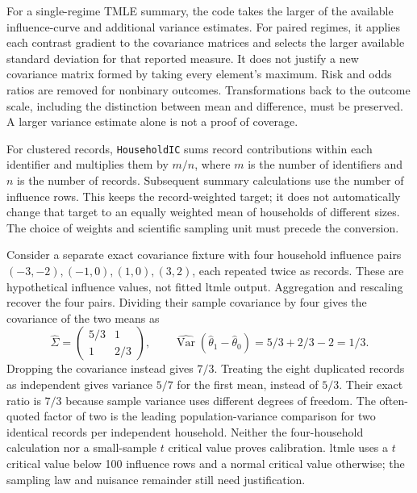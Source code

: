 For a single-regime TMLE summary, the code takes the larger of the available
influence-curve and additional variance estimates. For paired regimes, it
applies each contrast gradient to the covariance matrices and selects the
larger available standard deviation for that reported measure. It does not
justify a new covariance matrix formed by taking every element's maximum.
Risk and odds ratios are removed for nonbinary outcomes. Transformations back
to the outcome scale, including the distinction between mean and difference,
must be preserved. A larger variance estimate alone is not a proof of
coverage.~\citep{exec23_ltmle_source}

For clustered records, \texttt{HouseholdIC} sums record contributions within
each identifier and multiplies them by $m/n$, where $m$ is the number of
identifiers and $n$ is the number of records. Subsequent summary calculations
use the number of influence rows. This keeps the record-weighted target;
it does not automatically change that target to an equally weighted mean
of households of different sizes. The choice of weights and scientific
sampling unit must precede the conversion.

Consider a separate exact covariance fixture with four household influence
pairs $(-3,-2),(-1,0),(1,0),(3,2)$, each repeated twice as records. These are
hypothetical influence values, not fitted ltmle output. Aggregation and
rescaling recover the four pairs. Dividing their sample covariance by four
gives the covariance of the two means as
\begin{equation}
 \widehat\Sigma=\begin{pmatrix}5/3&1\\1&2/3\end{pmatrix},\qquad
 \widehat{\operatorname{Var}}(\widehat\theta_1-\widehat\theta_0)
 =5/3+2/3-2=1/3.
 \label{exec23:ltmle-cluster}
\end{equation}
Dropping the covariance instead gives $7/3$. Treating the eight duplicated
records as independent gives variance $5/7$ for the first mean, instead of
$5/3$. Their exact ratio is $7/3$ because sample variance uses different
degrees of freedom. The often-quoted factor of two is the leading
population-variance comparison for two identical records per independent
household. Neither the four-household calculation nor a small-sample
$t$ critical value proves calibration. ltmle uses a $t$ critical value below
100 influence rows and a normal critical value otherwise; the sampling law
and nuisance remainder still need justification.
\citep{exec23_ltmle_source,exec23_ltmle_exact}

